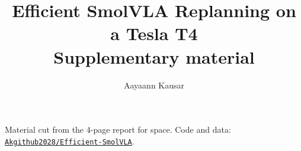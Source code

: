 \documentclass[10pt]{article}
\title{Efficient SmolVLA Replanning on a Tesla T4\\[4pt]
\large Supplementary material}
\author{Aayaann Kausar}
\date{}
\begin{document}
\maketitle
\noindent Material cut from the 4-page report for space. Code and data: \href{https://github.com/Akgithub2028/Efficient-SmolVLA}{\nolinkurl{Akgithub2028/Efficient-SmolVLA}}.

\end{document}
